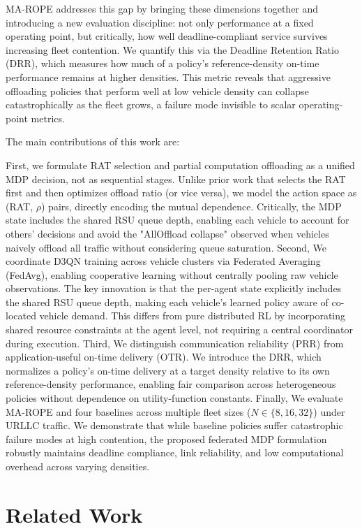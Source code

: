 \documentclass[journal,10pt,twocolumn]{IEEEtran}
\begin{document}
MA-ROPE addresses this gap by bringing these dimensions together and introducing a new evaluation discipline: not only performance at a fixed operating point, but critically, how well deadline-compliant service survives increasing fleet contention. We quantify this via the Deadline Retention Ratio (DRR), which measures how much of a policy's reference-density on-time performance remains at higher densities. This metric reveals that aggressive offloading policies that perform well at low vehicle density can collapse catastrophically as the fleet grows, a failure mode invisible to scalar operating-point metrics.

The main contributions of this work are:


First, we formulate RAT selection and partial computation offloading as a unified MDP decision, not as sequential stages. Unlike prior work that selects the RAT first and then optimizes offload ratio (or vice versa), we model the action space as (RAT, $\rho$) pairs, directly encoding the mutual dependence. Critically, the MDP state includes the shared RSU queue depth, enabling each vehicle to account for others' decisions and avoid the "AllOffload collapse" observed when vehicles naively offload all traffic without considering queue saturation.
Second, We coordinate D3QN training across vehicle clusters via Federated Averaging (FedAvg), enabling cooperative learning without centrally pooling raw vehicle observations. The key innovation is that the per-agent state explicitly includes the shared RSU queue depth, making each vehicle's learned policy aware of co-located vehicle demand. This differs from pure distributed RL by incorporating shared resource constraints at the agent level, not requiring a central coordinator during execution.
Third, We distinguish communication reliability (PRR) from application-useful on-time delivery (OTR). We introduce the DRR, which normalizes a policy's on-time delivery at a target density relative to its own reference-density performance, enabling fair comparison across heterogeneous policies without dependence on utility-function constants.
Finally, We evaluate MA-ROPE and four baselines across multiple fleet sizes ($N \in \{8, 16, 32\}$) under URLLC traffic. We demonstrate that while baseline policies suffer catastrophic failure modes at high contention, the proposed federated MDP formulation robustly maintains deadline compliance, link reliability, and low computational overhead across varying densities.


\section{Related Work}
\end{document}
